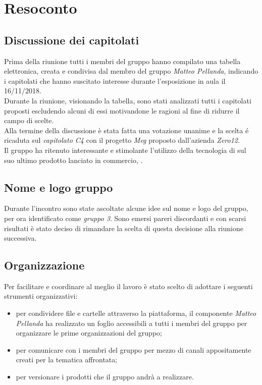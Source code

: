\clearpage
\section{Resoconto}
\subsection{Discussione dei capitolati}
	\label{sec:discussione}
	Prima della riunione tutti i membri del gruppo hanno compilato una tabella elettronica, creata e condivisa dal membro del gruppo \emph{Matteo Pellanda}, indicando i capitolati che hanno suscitato interesse durante l'esposizione in aula il 16/11/2018. \\
	Durante la  riunione, visionando la tabella, sono stati analizzati tutti  i  capitolati proposti escludendo alcuni di essi motivandone le ragioni al fine di ridurre il campo di scelte. \\
	Alla termine della discussione è stata fatta una votazione unanime e la scelta é ricaduta sul \emph{capitolato C4} con il progetto \emph{Meg} proposto dall’azienda \emph{Zero12}. \\ 
	Il gruppo ha ritenuto interessante e stimolante l’utilizzo della tecnologia  di  sul suo ultimo prodotto lanciato in commercio,  .
	\subsection{Nome e logo gruppo}
	\label{sec:nome_logo}
	Durante l'incontro sono state ascoltate alcune idee sul nome e logo del gruppo, per ora identificato come \emph{gruppo 3}. Sono emersi pareri discordanti e con scarsi risultati è stato deciso di rimandare la scelta di questa decisione alla riunione successiva.
	\subsection{Organizzazione}
	\label{sec:organizzazione}
	Per facilitare e coordinare al meglio il lavoro è stato scelto di adottare i seguenti strumenti organizzativi: 
	\begin{itemize}
		\item \textbf{} per condividere file e cartelle attraverso la piattaforma, il componente \emph{Matteo Pellanda} ha realizzato un foglio accessibili a tutti i membri del gruppo per organizzare le prime organizzazioni del gruppo;
		\item \textbf{} per comunicare con i membri del gruppo per mezzo di canali appositamente creati per la tematica affrontata;
		\item \textbf{} per versionare i prodotti che il gruppo andrà a realizzare.
	\end{itemize}